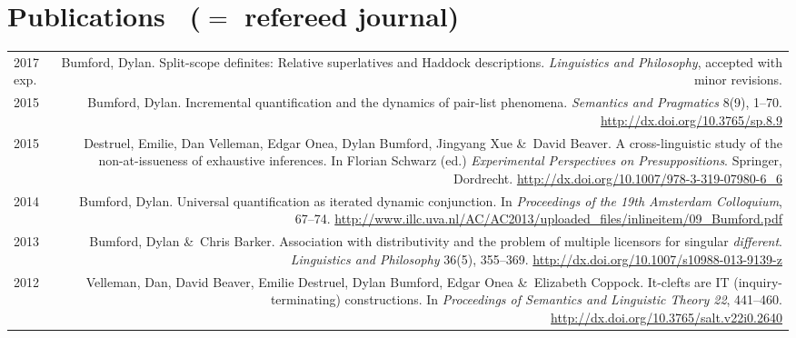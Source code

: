 \documentclass[12pt]{article}
\newcommand{\doi}[1]{\url{http://dx.doi.org/#1}}
\newcommand{\with}{\&}
\begin{document}
\bigskip

\section*{Publications \ \textrm{(\textdagger ${}={}$ refereed journal)}} 

\begin{longtable}{LR}
  2017 exp.
        & Bumford, Dylan. Split-scope definites: Relative superlatives and
          Haddock descriptions. \textit{Linguistics and Philosophy}, accepted
          with minor revisions.\\
  2015  & Bumford, Dylan. Incremental quantification and the dynamics of
          pair-list phenomena. \textit{Semantics and Pragmatics} 8(9), 1--70.
          \doi{10.3765/sp.8.9}\\
  2015  & Destruel, Emilie, Dan Velleman, Edgar Onea, Dylan Bumford, Jingyang Xue
          \with~David Beaver. A cross-linguistic study of the non-at-issueness
          of exhaustive inferences. In Florian Schwarz (ed.)
          \textit{Experimental Perspectives on Presuppositions}. Springer,
          Dordrecht.
          \doi{10.1007/978-3-319-07980-6_6}\\ %
  2014  & Bumford, Dylan. Universal quantification as iterated dynamic
          conjunction. In \textit{Proceedings of the 19th Amsterdam
          Colloquium}, 67--74.
          \url{http://www.illc.uva.nl/AC/AC2013/uploaded_files/inlineitem/09_Bumford.pdf}\\
  2013  & Bumford, Dylan \with~Chris Barker. Association with distributivity
          and the problem of multiple licensors for singular
          \textit{different}. \textit{Linguistics and Philosophy} 36(5),
          355--369.
          \doi{10.1007/s10988-013-9139-z}\\ %
  2012  & Velleman, Dan, David Beaver, Emilie Destruel, Dylan Bumford, Edgar
          Onea \with~Elizabeth Coppock. It-clefts are IT (inquiry-terminating)
          constructions. In \textit{Proceedings of Semantics and Linguistic
          Theory 22}, 441--460.
          \doi{10.3765/salt.v22i0.2640}
\end{longtable}
\end{document}
